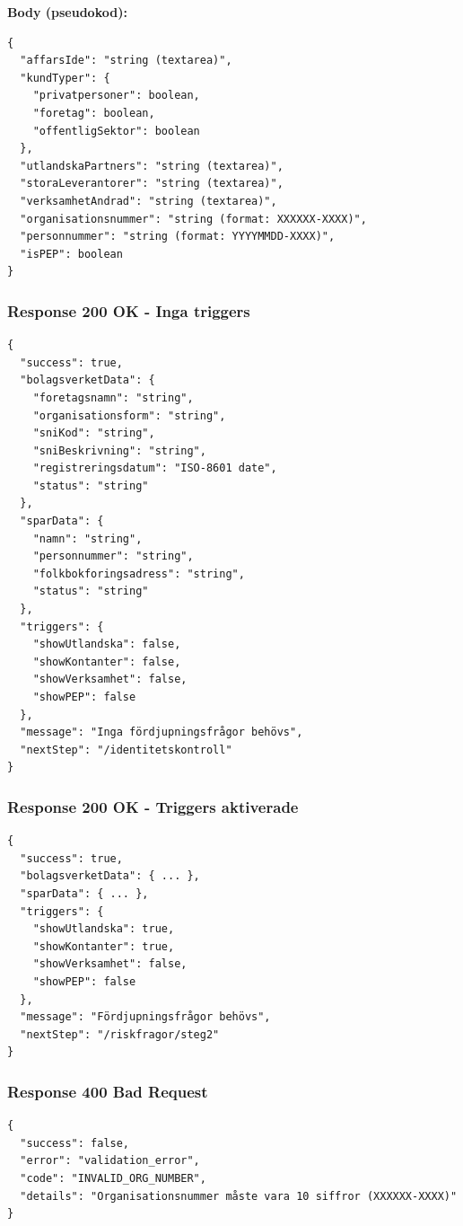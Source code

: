 \textbf{Body (pseudokod):}
\begin{lstlisting}
{
  "affarsIde": "string (textarea)",
  "kundTyper": {
    "privatpersoner": boolean,
    "foretag": boolean,
    "offentligSektor": boolean
  },
  "utlandskaPartners": "string (textarea)",
  "storaLeverantorer": "string (textarea)",
  "verksamhetAndrad": "string (textarea)",
  "organisationsnummer": "string (format: XXXXXX-XXXX)",
  "personnummer": "string (format: YYYYMMDD-XXXX)",
  "isPEP": boolean
}
\end{lstlisting}

\subsubsection{Response 200 OK - Inga triggers}

\begin{lstlisting}
{
  "success": true,
  "bolagsverketData": {
    "foretagsnamn": "string",
    "organisationsform": "string",
    "sniKod": "string",
    "sniBeskrivning": "string",
    "registreringsdatum": "ISO-8601 date",
    "status": "string"
  },
  "sparData": {
    "namn": "string",
    "personnummer": "string",
    "folkbokforingsadress": "string",
    "status": "string"
  },
  "triggers": {
    "showUtlandska": false,
    "showKontanter": false,
    "showVerksamhet": false,
    "showPEP": false
  },
  "message": "Inga fördjupningsfrågor behövs",
  "nextStep": "/identitetskontroll"
}
\end{lstlisting}

\subsubsection{Response 200 OK - Triggers aktiverade}

\begin{lstlisting}
{
  "success": true,
  "bolagsverketData": { ... },
  "sparData": { ... },
  "triggers": {
    "showUtlandska": true,
    "showKontanter": true,
    "showVerksamhet": false,
    "showPEP": false
  },
  "message": "Fördjupningsfrågor behövs",
  "nextStep": "/riskfragor/steg2"
}
\end{lstlisting}

\subsubsection{Response 400 Bad Request}

\begin{lstlisting}
{
  "success": false,
  "error": "validation_error",
  "code": "INVALID_ORG_NUMBER",
  "details": "Organisationsnummer måste vara 10 siffror (XXXXXX-XXXX)"
}
\end{lstlisting}

